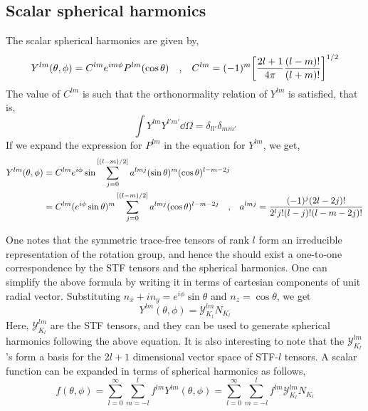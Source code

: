 \documentclass[a4paper,11pt]{article}
\begin{document}
\subsection{Scalar spherical harmonics}
The scalar spherical harmonics are given by,
\begin{equation*}
Y^{lm} (\theta , \phi) = C^{lm} e^{i m \phi} P^{lm} (\cos \theta) \qq{,} C^{lm} = (-1)^m \qty[\dfrac{2l + 1}{4 \pi} \dfrac{(l-m)!}{(l+m)!}]^{1/2}
\end{equation*}
The value of $ C^{lm} $ is such that the orthonormality relation of $ Y^{lm} $ is satisfied, that is,
\begin{equation*}
\int Y^{lm} Y^{l'm'} \dd{\Omega} = \delta_{ll'} \delta_{mm'}
\end{equation*}
If we expand the expression for $ P^{lm} $ in the equation for $ Y^{lm} $, we get,
\begin{align*}
Y^{lm} (\theta , \phi)&= C^{lm} e^{i  \phi} \sin \sum_{j=0}^{[(l-m)/2]} a^{lmj} (\sin\theta)^m (\cos \theta)^{l-m-2j} \\
&= C^{lm} (e^{i  \phi} \sin \theta)^m \sum_{j=0}^{[(l-m)/2]} a^{lmj} (\cos \theta)^{l-m-2j}  \qq{,} a^{lmj} = \dfrac{(-1)^j (2l - 2j)!}{2^l j! (l-j)! (l-m-2j)!}
\end{align*}

One notes that the symmetric trace-free tensors of rank $ l $ form an irreducible representation of the rotation group, and hence the should exist a one-to-one correspondence by the STF tensors and the spherical harmonics. One can simplify the above formula by writing it in terms of cartesian components of unit radial vector. Substituting $ n_x + i n_y = e^{i  \phi} \sin \theta $ and $ n_z = \cos \theta $, we get
\begin{equation*}
Y^{lm} (\theta, \phi) = \mathcal{Y}^{lm}_{K_l} N_{K_l}
\end{equation*}
Here, $ \mathcal{Y}^{lm}_{K_l} $ are the STF tensors, and they can be used to generate spherical harmonics following the above equation. It is also interesting to note that the  $ \mathcal{Y}^{lm}_{K_l} $'s form a basis for the $ 2l+1 $ dimensional vector space of STF-$ l $ tensors. A scalar function can be expanded in terms of spherical harmonics as follows,
\begin{equation*}
f(\theta,\phi) =  \sum_{l = 0}^{\infty} \sum_{m=-l}^{l} f^{lm} Y^{lm} (\theta, \phi) = \sum_{l = 0}^{\infty} \sum_{m=-l}^{l} f^{lm} \mathcal{Y}^{lm}_{K_l} N_{K_l}
\end{equation*}
\end{document}
